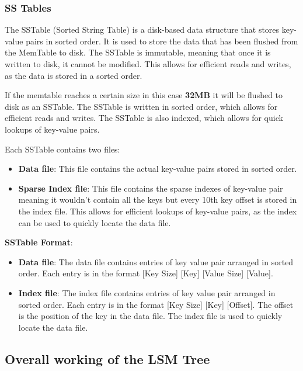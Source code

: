 \documentclass{article}
\begin{document}
\subsubsection{SS Tables}

\noindent The SSTable (Sorted String Table) is a disk-based data structure that stores key-value pairs in sorted order. It is used to store the data that has been flushed from the MemTable to disk. The SSTable is immutable, meaning that once it is written to disk, it cannot be modified. This allows for efficient reads and writes, as the data is stored in a sorted order.

\noindent If the memtable reaches a certain size in this case \textbf{32MB} it will be flushed to disk as an SSTable. The SSTable is written in sorted order, which allows for efficient reads and writes. The SSTable is also indexed, which allows for quick lookups of key-value pairs.

\noindent Each SSTable contains two files:
\begin{itemize}
    \item \textbf{Data file}: This file contains the actual key-value pairs stored in sorted order.
    \item \textbf{Sparse Index file}: This file contains the sparse indexes of key-value pair meaning it wouldn't contain all the keys but every 10th key offset is stored in the index file. This allows for efficient lookups of key-value pairs, as the index can be used to quickly locate the data file.
\end{itemize}

\noindent \textbf{SSTable Format}:
\begin{itemize}
      \item \textbf{Data file}: The data file contains entries of key value pair arranged in sorted order. Each entry is in the format [Key Size] [Key] [Value Size] [Value].
      \item \textbf{Index file}: The index file contains entries of key value pair arranged in sorted order. Each entry is in the format [Key Size] [Key] [Offset]. The offset is the position of the key in the data file. The index file is used to quickly locate the data file.
\end{itemize}

\subsection{Overall working of the LSM Tree}
\end{document}
